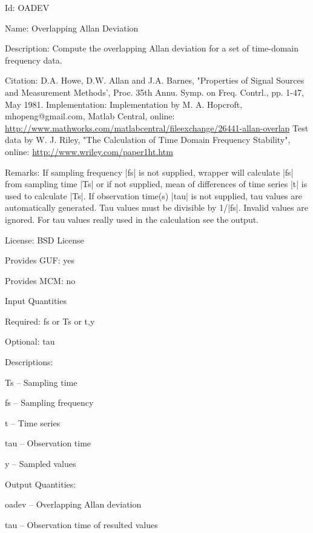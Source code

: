 \begin{tightdesc}
\item [Id:] OADEV
\item [Name:] Overlapping Allan Deviation
\item [Description:] Compute the overlapping Allan deviation for a set of time-domain frequency data.
\item [Citation:] D.A. Howe, D.W. Allan and J.A. Barnes, "Properties of Signal Sources and Measurement Methods', Proc. 35th Annu. Symp. on Freq. Contrl., pp. 1-47, May 1981. Implementation: Implementation by M. A. Hopcroft, mhopeng@gmail.com, Matlab Central, online: \url{http://www.mathworks.com/matlabcentral/fileexchange/26441-allan-overlap} Test data by W. J. Riley, "The Calculation of Time Domain Frequency Stability", online: \url{http://www.wriley.com/paper1ht.htm}
\item [Remarks:] If sampling frequency |fs| is not supplied, wrapper will calculate |fs| from sampling time |Ts| or if not supplied, mean of differences of time series |t| is used to calculate |Ts|. If observation time(s) |tau| is not supplied, tau values are automatically generated. Tau values must be divisible by 1/|fs|. Invalid values are ignored. For tau values really used in the calculation see the output.
\item [License:] BSD License
\item [Provides GUF:] yes
\item [Provides MCM:] no
\item [Input Quantities] \rule{0em}{0em}
    \begin{tightdesc}
    \item [Required:] 
        \textsf{fs} or \textsf{Ts} or \textsf{t},\enspace \textsf{y}
    \item [Optional:] 
        \textsf{tau}
    \item [Descriptions:] \rule{0em}{0em}
        \begin{tightdesc}
            \item[\textsf{Ts}] -- Sampling time
            \item[\textsf{fs}] -- Sampling frequency
            \item[\textsf{t}] -- Time series
            \item[\textsf{tau}] -- Observation time
            \item[\textsf{y}] -- Sampled values
        \end{tightdesc}
    \end{tightdesc}
\item [Output Quantities:] \rule{0em}{0em}
    \begin{tightdesc}
        \item[\textsf{oadev}] -- Overlapping Allan deviation
        \item[\textsf{tau}] -- Observation time of resulted values
    \end{tightdesc}
\end{tightdesc}
